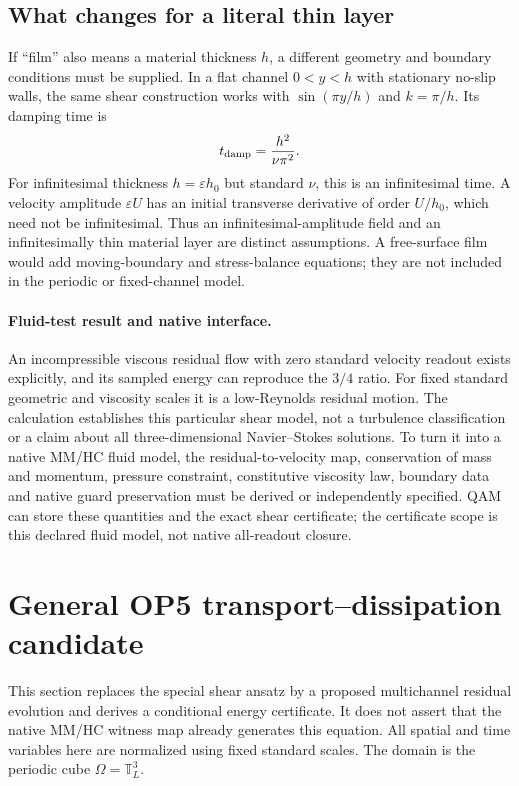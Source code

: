 \documentclass[11pt,a4paper]{article}
\begin{document}
\subsection{What changes for a literal thin layer}
If ``film'' also means a material thickness $h$, a different geometry and
boundary conditions must be supplied. In a flat channel $0<y<h$ with
stationary no-slip walls, the same shear construction works with
$\sin(\pi y/h)$ and $k=\pi/h$. Its damping time is
\[
t_{\rm damp}=\frac{h^2}{\nu\pi^2}.
\]
For infinitesimal thickness $h=\varepsilon h_0$ but standard $\nu$,
this is an infinitesimal time. A velocity amplitude $\varepsilon U$ has
an initial transverse derivative of order $U/h_0$, which need not be
infinitesimal. Thus an infinitesimal-amplitude field and an infinitesimally
thin material layer are distinct assumptions. A free-surface film would
add moving-boundary and stress-balance equations; they are not included in
the periodic or fixed-channel model.

\paragraph{Fluid-test result and native interface.}
An incompressible viscous residual flow with zero standard velocity readout
exists explicitly, and its sampled energy can reproduce the $3/4$ ratio.
For fixed standard geometric and viscosity scales it is a low-Reynolds
residual motion. The calculation establishes this particular shear model,
not a turbulence classification or a claim about all three-dimensional
Navier--Stokes solutions. To turn it into a native MM/HC fluid model,
the residual-to-velocity map, conservation of mass and momentum, pressure
constraint, constitutive viscosity law, boundary data and native guard
preservation must be derived or independently specified.
QAM can store these quantities and the exact shear certificate; the
certificate scope is this declared fluid model, not native all-readout closure.

\section{General OP5 transport--dissipation candidate}
\label{sec:general-op5-transport}
This section replaces the special shear ansatz by a proposed multichannel
residual evolution and derives a conditional energy certificate. It does
not assert that the native MM/HC witness map already generates this equation.
All spatial and time variables here are normalized using fixed standard
scales. The domain is the periodic cube $\Omega=\mathbb T_L^3$.
\end{document}
